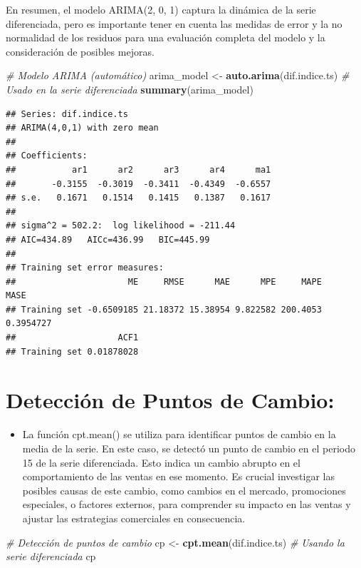 \documentclass[
]{book}
\newenvironment{Shaded}{\begin{snugshade}}{\end{snugshade}}
\newcommand{\CommentTok}[1]{\textcolor[rgb]{0.56,0.35,0.01}{\textit{#1}}}
\newcommand{\FunctionTok}[1]{\textcolor[rgb]{0.13,0.29,0.53}{\textbf{#1}}}
\newcommand{\NormalTok}[1]{#1}
\newcommand{\OtherTok}[1]{\textcolor[rgb]{0.56,0.35,0.01}{#1}}
\providecommand{\tightlist}{%
  \setlength{\itemsep}{0pt}\setlength{\parskip}{0pt}}
\begin{document}
En resumen, el modelo ARIMA(2, 0, 1) captura la dinámica de la serie diferenciada, pero es importante tener en cuenta las medidas de error y la no normalidad de los residuos para una evaluación completa del modelo y la consideración de posibles mejoras.

\begin{Shaded}
\begin{Highlighting}[]
\CommentTok{\# Modelo ARIMA (automático)}
\NormalTok{arima\_model }\OtherTok{\textless{}{-}} \FunctionTok{auto.arima}\NormalTok{(dif.indice.ts) }\CommentTok{\# Usado en la serie diferenciada}
\FunctionTok{summary}\NormalTok{(arima\_model)}
\end{Highlighting}
\end{Shaded}

\begin{verbatim}
## Series: dif.indice.ts 
## ARIMA(4,0,1) with zero mean 
## 
## Coefficients:
##           ar1      ar2      ar3      ar4      ma1
##       -0.3155  -0.3019  -0.3411  -0.4349  -0.6557
## s.e.   0.1671   0.1514   0.1415   0.1387   0.1617
## 
## sigma^2 = 502.2:  log likelihood = -211.44
## AIC=434.89   AICc=436.99   BIC=445.99
## 
## Training set error measures:
##                      ME     RMSE      MAE      MPE     MAPE      MASE
## Training set -0.6509185 21.18372 15.38954 9.822582 200.4053 0.3954727
##                    ACF1
## Training set 0.01878028
\end{verbatim}

\section{Detección de Puntos de Cambio:}\label{detecciuxf3n-de-puntos-de-cambio}

\begin{itemize}
\tightlist
\item
  La función cpt.mean() se utiliza para identificar puntos de cambio en la media de la serie. En este caso, se detectó un punto de cambio en el periodo 15 de la serie diferenciada. Esto indica un cambio abrupto en el comportamiento de las ventas en ese momento. Es crucial investigar las posibles causas de este cambio, como cambios en el mercado, promociones especiales, o factores externos, para comprender su impacto en las ventas y ajustar las estrategias comerciales en consecuencia.
\end{itemize}

\begin{Shaded}
\begin{Highlighting}[]
\CommentTok{\# Detección de puntos de cambio}
\NormalTok{cp }\OtherTok{\textless{}{-}} \FunctionTok{cpt.mean}\NormalTok{(dif.indice.ts) }\CommentTok{\# Usando la serie diferenciada}
\NormalTok{cp}
\end{Highlighting}
\end{Shaded}
\end{document}
